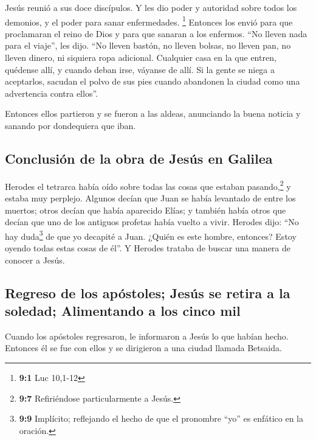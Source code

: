  Jesús reunió a sus doce discípulos. Y les dio poder y
autoridad sobre todos los demonios, y el poder para sanar enfermedades.
\footnote{\textbf{9:1} Luc 10,1-12}  Entonces los envió
para que proclamaran el reino de Dios y para que sanaran a los enfermos.
 ``No lleven nada para el viaje'', les dijo. ``No lleven
bastón, no lleven bolsas, no lleven pan, no lleven dinero, ni siquiera
ropa adicional.  Cualquier casa en la que entren, quédense
allí, y cuando deban irse, váyanse de allí.  Si la gente
se niega a aceptarlos, sacudan el polvo de sus pies cuando abandonen la
ciudad como una advertencia contra ellos''.

 Entonces ellos partieron y se fueron a las aldeas,
anunciando la buena noticia y sanando por dondequiera que iban.

\hypertarget{conclusiuxf3n-de-la-obra-de-jesuxfas-en-galilea}{%
\subsection{Conclusión de la obra de Jesús en
Galilea}\label{conclusiuxf3n-de-la-obra-de-jesuxfas-en-galilea}}

 Herodes el tetrarca había oído sobre todas las cosas que
estaban pasando,\footnote{\textbf{9:7} Refiriéndose particularmente a
  Jesús.} y estaba muy perplejo. Algunos decían que Juan se había
levantado de entre los muertos;  otros decían que había
aparecido Elías; y también había otros que decían que uno de los
antiguos profetas había vuelto a vivir.  Herodes dijo:
``No hay duda\footnote{\textbf{9:9} Implícito; reflejando el hecho de
  que el pronombre ``yo'' es enfático en la oración.} de que yo decapité
a Juan. ¿Quién es este hombre, entonces? Estoy oyendo todas estas cosas
de él''. Y Herodes trataba de buscar una manera de conocer a Jesús.

\hypertarget{regreso-de-los-apuxf3stoles-jesuxfas-se-retira-a-la-soledad-alimentando-a-los-cinco-mil}{%
\subsection{Regreso de los apóstoles; Jesús se retira a la soledad;
Alimentando a los cinco
mil}\label{regreso-de-los-apuxf3stoles-jesuxfas-se-retira-a-la-soledad-alimentando-a-los-cinco-mil}}

 Cuando los apóstoles regresaron, le informaron a Jesús
lo que habían hecho. Entonces él se fue con ellos y se dirigieron a una
ciudad llamada Betsaida.

